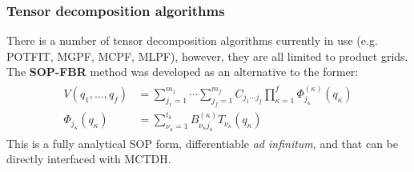 \documentclass{beamer}
\begin{document}
\begin{frame}
  \frametitle{Tensor decomposition algorithms}
  There is a number of tensor decomposition algorithms currently in use (e.g. POTFIT, MGPF, MCPF, MLPF), however, they are all limited to product grids. The \textbf{SOP-FBR} method was developed as an alternative to the former:
\begin{align}
  \label{sopfbr}
  \begin{split}
    V(q_1, \ldots, q_f) &= \sum_{j_1=1}^{m_1} \cdots \sum_{j_f=1}^{m_f} C_{j_1 \cdots j_f}\prod_{\kappa=1}^f \Phi_{j_{\kappa}}^{(\kappa)}(q_{\kappa})\\
    \Phi_{j_{\kappa}}(q_{\kappa}) &= \sum_{\nu_{\kappa}=1}^{t_k}B_{\nu_{\kappa}j_{\kappa}}^{(\kappa)}T_{\nu_{\kappa}}(q_{\kappa})
  \end{split}
\end{align}
This is a fully analytical SOP form, differentiable \emph{ad infinitum}, and that can be directly interfaced with MCTDH\@.
  
\end{frame}
\end{document}
